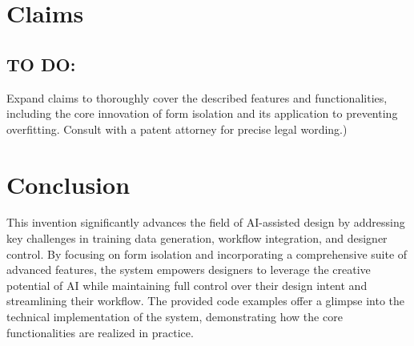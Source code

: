 \documentclass{article}
\begin{document}
\section{Claims}

\subsection{TO DO:}
Expand claims to thoroughly cover the described features and functionalities, including the core innovation of form isolation and its application to preventing overfitting. Consult with a patent attorney for precise legal wording.)

\section{Conclusion}

This invention significantly advances the field of AI-assisted design by addressing key challenges in training data generation, workflow integration, and designer control. By focusing on form isolation and incorporating a comprehensive suite of advanced features, the system empowers designers to leverage the creative potential of AI while maintaining full control over their design intent and streamlining their workflow. The provided code examples offer a glimpse into the technical implementation of the system, demonstrating how the core functionalities are realized in practice. 
\end{document}
